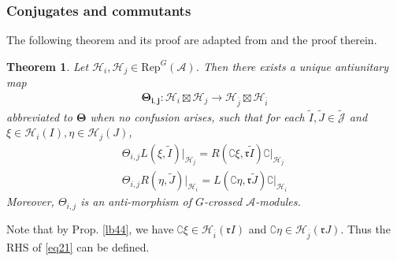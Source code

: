 \documentclass[11pt,b5paper,notitlepage]{article}
\theoremstyle{definition}
\theoremstyle{plain}
\newtheorem{thm}[df]{Theorem}
\newcommand{\wtd}{\widetilde}
\newcommand{\ovl}{\overline}
\newcommand{\RepGA}{\mathrm{Rep}^G(\mathcal A)}
\newcommand{\Jtd}{\widetilde{\mathcal J}}
\newcommand{\Co}{\complement}
\newcommand{\rk}{\mathfrak r}
\newcommand{\MA}{\mathcal A}
\newcommand{\MH}{\mathcal H}
\numberwithin{equation}{section}
\begin{document}
\subsubsection{Conjugates and commutants}

The following theorem and its proof are adapted from \cite[Prop. A.9]{MS26a} and the proof therein.


\begin{thm}\label{lb49}
Let $\MH_i,\MH_j\in\RepGA$. Then there exists a unique antiunitary map
\begin{gather*}
\pmb{\Theta_{i,j}}:\MH_i\boxtimes\MH_j\rightarrow\MH_{\ovl j}\boxtimes\MH_{\ovl i}
\end{gather*}
abbreviated to $\pmb{\Theta}$ when no confusion arises, such that for each $\wtd I,\wtd J\in\Jtd$ and $\xi\in\MH_i(I),\eta\in\MH_j(J)$,
\begin{subequations}\label{eq21}
\begin{gather}
\Theta_{i,j}L(\xi,\wtd I)\big|_{\MH_j}=R(\Co\xi,\rk \wtd I)\Co\big|_{\MH_j}\label{eq21a}\\
\Theta_{i,j}R(\eta,\wtd J)\big|_{\MH_i}=L(\Co\eta,\rk \wtd J)\Co\big|_{\MH_i}\label{eq21b}
\end{gather}
\end{subequations}
Moreover, $\Theta_{i,j}$ is an anti-morphism of $G$-crossed $\MA$-modules.
\end{thm}

Note that by Prop. \ref{lb44}, we have $\Co\xi\in\MH_{\ovl i}(\rk I)$ and $\Co\eta\in\MH_{\ovl j}(\rk J)$. Thus the RHS of \eqref{eq21} can be defined.
\end{document}
